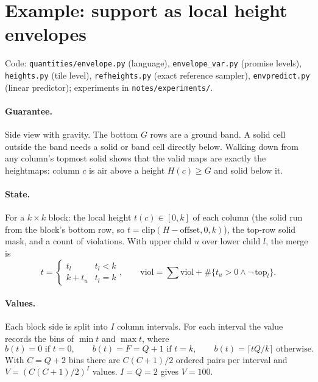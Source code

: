 \documentclass[11pt]{article}
\newcommand{\1}{\mathds{1}}
\begin{document}
\section{Example: support as local height envelopes}
\label{sec:support}

Code: \texttt{quantities/envelope.py} (language), \texttt{envelope\_var.py} (promise levels),
\texttt{heights.py} (tile level), \texttt{refheights.py} (exact reference sampler),
\texttt{envpredict.py} (linear predictor); experiments in \texttt{notes/experiments/}.

\paragraph{Guarantee.} Side view with gravity. The bottom $G$ rows are a ground band. A solid
cell outside the band needs a solid or band cell directly below. Walking down from any
column's topmost solid shows that the valid maps are exactly the heightmaps: column $c$ is air
above a height $H(c) \ge G$ and solid below it.

\paragraph{State.} For a $k \times k$ block: the local height $t(c) \in [0,k]$ of each column
(the solid run from the block's bottom row, so $t = \mathrm{clip}(H - \text{offset}, 0, k)$),
the top-row solid mask, and a count of violations. With upper child $u$ over lower child $l$,
the merge is
\[
  t = \begin{cases} t_l & t_l < k \\ k + t_u & t_l = k \end{cases},
  \qquad \text{viol} = \textstyle\sum \text{viol} + \#\{t_u > 0 \wedge \neg\,\mathrm{top}_l\}.
\]

\paragraph{Values.} Each block side is split into $I$ column intervals. For each interval the
value records the bins of $\min t$ and $\max t$, where
\[
  b(t) = 0 \text{ if } t = 0, \qquad b(t) = F = Q+1 \text{ if } t = k, \qquad
  b(t) = \lceil tQ/k \rceil \text{ otherwise}.
\]
With $C = Q+2$ bins there are $C(C+1)/2$ ordered pairs per interval and $V = (C(C+1)/2)^I$
values. $I = Q = 2$ gives $V = 100$.
\end{document}
